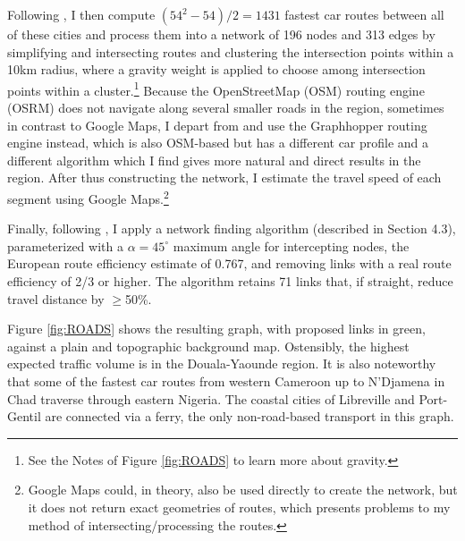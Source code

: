 \documentclass[a4paper]{article}
\begin{document}
Following \citet{krantz2024optimal}, I then compute $(54^2-54)/2 = 1431$ fastest car routes between all of these cities and process them into a network of 196 nodes and 313 edges by simplifying and intersecting routes and clustering the intersection points within a 10km radius, where a gravity weight is applied to choose among intersection points within a cluster.\footnote{See the Notes of Figure \ref{fig:ROADS} to learn more about gravity.} Because the OpenStreetMap (OSM) routing engine (OSRM) does not navigate along several smaller roads in the region, sometimes in contrast to Google Maps, I depart from \citet{krantz2024optimal} and use the Graphhopper routing engine instead, which is also OSM-based but has a different car profile and a different algorithm which I find gives more natural and direct results in the region. After thus constructing the network, I estimate the travel speed of each segment using Google Maps.\footnote{Google Maps could, in theory, also be used directly to create the network, but it does not return exact geometries of routes, which presents problems to my method of intersecting/processing the routes.}   \newline 

Finally, following \citet{krantz2024optimal}, I apply a network finding algorithm (described in \citet{krantz2024optimal} Section 4.3), parameterized with a $\alpha = 45^\circ$ maximum angle for intercepting nodes, the European route efficiency estimate of 0.767, and removing links with a real route efficiency of 2/3 or higher. The algorithm retains 71 links that, if straight, reduce travel distance by $\geq$50\%. \newline

Figure \ref{fig:ROADS} shows the resulting graph, with proposed links in green, against a plain and topographic background map. Ostensibly, the highest expected traffic volume is in the Douala-Yaounde region. It is also noteworthy that some of the fastest car routes from western Cameroon up to N'Djamena in Chad traverse through eastern Nigeria. The coastal cities of Libreville and Port-Gentil are connected via a ferry, the only non-road-based transport in this graph.  %
\end{document}
